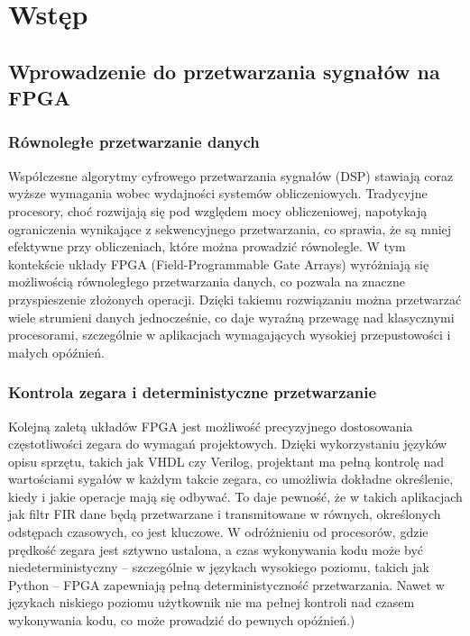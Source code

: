 \chapter{Wstęp}
\label{cha:wstęp}

\section{Wprowadzenie do przetwarzania sygnałów na FPGA}
\label{sec:wprowadzenie}

\subsection{Równoległe przetwarzanie danych}
Współczesne algorytmy cyfrowego przetwarzania sygnałów (DSP) stawiają coraz wyższe wymagania wobec wydajności systemów obliczeniowych.
Tradycyjne procesory, choć rozwijają się pod względem mocy obliczeniowej, napotykają ograniczenia wynikające z sekwencyjnego przetwarzania,
co sprawia, że są mniej efektywne przy obliczeniach, które można prowadzić równolegle. W tym kontekście układy FPGA (Field-Programmable Gate Arrays) wyróżniają się
możliwością równoległego przetwarzania danych, co pozwala na znaczne przyspieszenie złożonych operacji. Dzięki takiemu rozwiązaniu można przetwarzać wiele
strumieni danych jednocześnie, co daje wyraźną przewagę nad klasycznymi procesorami, szczególnie w aplikacjach wymagających wysokiej przepustowości i małych opóźnień.

\subsection{Kontrola zegara i deterministyczne przetwarzanie}
Kolejną zaletą układów FPGA jest możliwość precyzyjnego dostosowania częstotliwości zegara do wymagań projektowych. Dzięki wykorzystaniu języków opisu sprzętu,
takich jak VHDL czy Verilog, projektant ma pełną kontrolę nad wartościami sygałów w każdym takcie zegara, co umożliwia dokładne określenie, kiedy i jakie operacje mają się odbywać.
To daje pewność, że w takich aplikacjach jak filtr FIR dane będą przetwarzane i transmitowane w równych, określonych odstępach czasowych, co jest kluczowe. W odróżnieniu od procesorów,
gdzie prędkość zegara jest sztywno ustalona, a czas wykonywania kodu może być niedeterministyczny -- szczególnie w językach wysokiego poziomu, takich jak Python -- FPGA zapewniają
pełną deterministyczność przetwarzania. Nawet w językach niskiego poziomu użytkownik nie ma pełnej kontroli nad czasem wykonywania kodu, co może prowadzić do pewnych opóźnień.)

